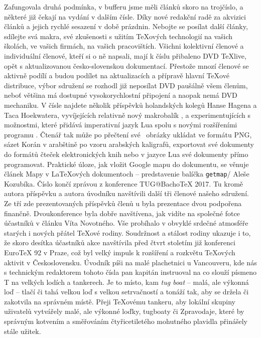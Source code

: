 Zafungovala druhá podmínka, v bufferu jsme měli článků skoro na trojčíslo, a některé již čekají na vydání v dalším čísle. Díky nové redakční radě za akvizici článků a jejich rychlé sesazení v době prázdnin.  Nebojte se posílat další články, sdílejte svá makra, své zkušenosti s užitím \TeX ových technologií na vašich školách, ve vašich firmách, na vašich pracovištích.
Všichni kolektivní členové a individuální členové, kteří si o ně napsali, mají k číslu přibaleno DVD \TeX{}live, opět s aktualizovanou česko-slovenskou dokumentací. Přestože mnozí členové se aktivně podílí a budou podílet na aktualizacích a přípravě hlavní \TeX ové distribuce, výbor sdružení se rozhodl již neposílat DVD paušálně všem členům, neboť většina má dostupné vysokorychlostní připojení a naopak nemá DVD mechaniku.
V čísle najdete několik příspěvků holandských kolegů Hanse Hagena a Taca Hoekwatera, vyvíjejících relativně nový makrobalík , a experimentujících s možnostmi, které přidává imperativní jazyk Lua spolu s novými rozšířeními programu \MP. Čtenář tak může po přečtení své \MP\ obrázky ukládat ve formátu PNG, sázet Korán v arabštině po vzoru arabských kaligrafů, exportovat své dokumenty do formátů čteček elektronických knih nebo v jazyce Lua své dokumenty přímo programovat.
Praktické úloze, jak vložit Google mapu do dokumentu, se věnuje článek \p Mapy v \LaTeX ových dokumentoch -- predstavenie balíčka \texttt{getmap}/ Aleše Kozubíka.
Číslo končí zprávou z konference TUG@Bacho\TeX{} 2017.  Tu kromě autora příspěvku a autora úvodníku navštívili další tři členové našeho sdružení. Ze tří zde prezentovaných příspěvků členů \CSTUG u byla prezentace dvou podpořena finančně.  Dvoukonference byla dobře navštívena, jak vidíte na společné fotce účastníků v článku Víta Novotného.  Vše probíhalo v obvyklé srdečné atmosféře starých i nových přátel \TeX{}ové rodiny. Soudržnost a stálost rodiny ukazuje i to, že skoro desítka účastníků akce navštívila před čtvrt stoletím již konferenci Euro\TeX{} 92 v Praze, což byl velký impuls k rozšíření a rozkvětu TeXových aktivit v Československu.
Úvodník píši na malé plachetnici u Vancouveru, kde nás s technickým redaktorem tohoto čísla pan kapitán instruoval na co slouží písmeno T na velkých lodích a tankerech.  Je to místo, kam \textit{tug boat} -- malá, ale výkonná loď -- tlačí či tahá velkou loď s velkou setrvačností a tonáží tak, aby se držela či zakotvila na správném místě.
Přeji \TeX ovému tankeru, aby lokální skupiny uživatelů vytvářely malé, ale výkonné loďky, tugboaty či Zpravodaje, které by správným kotvením a směřováním čtyřicetiletého mohutného plavidla přinášely stále užitek.
